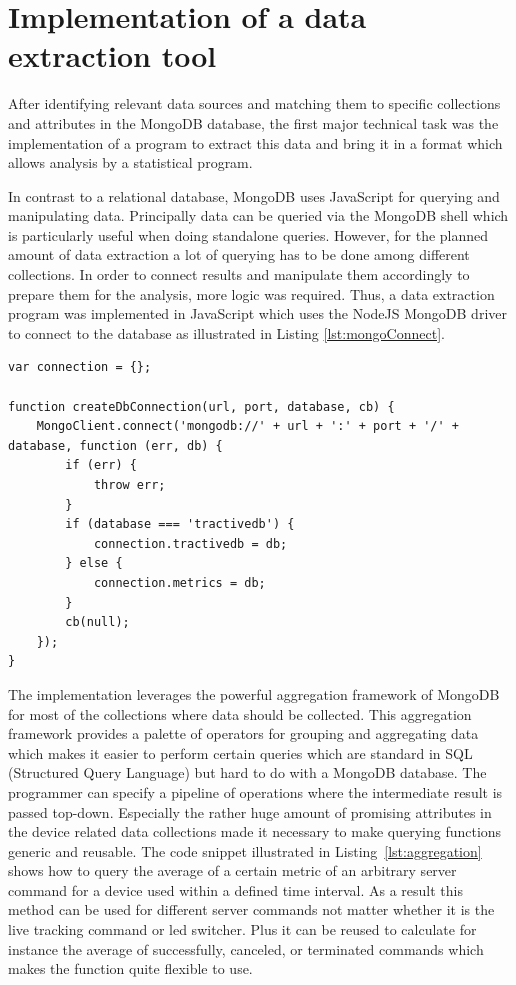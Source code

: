 \section{Implementation of a data extraction tool}
\label{sec:extractionTool}
After identifying relevant data sources and matching them to specific collections and attributes in the MongoDB database, the first major technical task was the implementation of a program to extract this data and bring it in a format which allows analysis by a statistical program. 

In contrast to a relational database, MongoDB uses JavaScript for querying and manipulating data. Principally data can be queried via the MongoDB shell which is particularly useful when doing standalone queries. However, for the planned amount of data extraction a lot of querying has to be done among different collections. In order to connect results and manipulate them accordingly to prepare them for the analysis, more logic was required. Thus, a data extraction program was implemented in JavaScript which uses the NodeJS MongoDB driver to connect to the database as illustrated in Listing \ref{lst:mongoConnect}.

\begin{lstlisting}[caption={Connecting to the database via MongoDB NodeJS driver}, label={lst:mongoConnect}]
var connection = {};

function createDbConnection(url, port, database, cb) {
	MongoClient.connect('mongodb://' + url + ':' + port + '/' + database, function (err, db) {
		if (err) {
			throw err;
		}
		if (database === 'tractivedb') {
			connection.tractivedb = db;
		} else {
			connection.metrics = db;
		}
		cb(null);
	});
}
\end{lstlisting}

The implementation leverages the powerful aggregation framework of MongoDB for most of the collections where data should be collected. This aggregation framework provides a palette of operators for grouping and aggregating data which makes it easier to perform certain queries which are standard in SQL (Structured Query Language) but hard to do with a MongoDB database. The programmer can specify a pipeline of operations where the intermediate result is passed top-down. Especially the rather huge amount of promising attributes in the device related data collections made it necessary to make querying functions generic and reusable. The code snippet illustrated in Listing~\ref{lst:aggregation} shows how to query the average of a certain metric of an arbitrary server command for a device used within a defined time interval. As a result this method can be used for different server commands not matter whether it is the live tracking command or led switcher. Plus it can be reused to calculate for instance the average of successfully, canceled, or terminated commands which makes the function quite flexible to use. 

